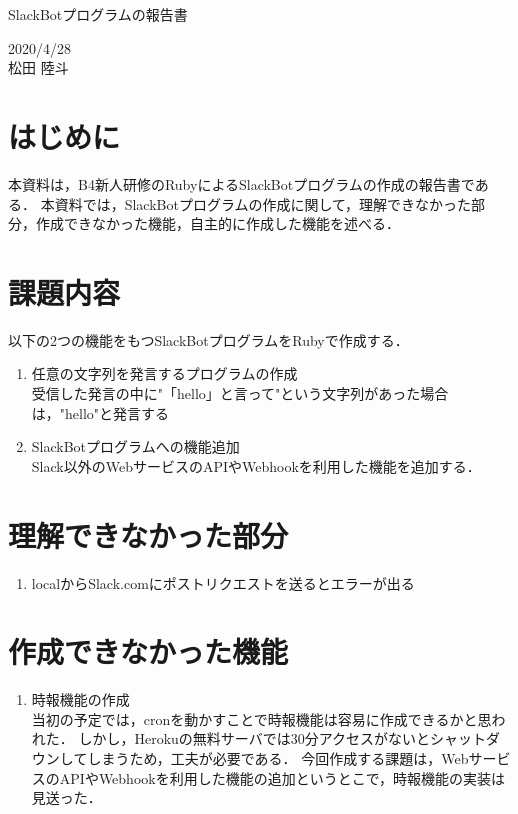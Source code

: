 \documentclass[12pt]{jsarticle}
\begin{document}
\begin{center}
{\LARGE SlackBotプログラムの報告書}
\end{center}

\begin{flushright}
  2020/4/28\\
  松田 陸斗
\end{flushright}
\section{はじめに}
\label{sec:introduction}
本資料は，B4新人研修のRubyによるSlackBotプログラムの作成の報告書である．
本資料では，SlackBotプログラムの作成に関して，理解できなかった部分，作成できなかった機能，自主的に作成した機能を述べる．

\section{課題内容}
以下の2つの機能をもつSlackBotプログラムをRubyで作成する．
\begin{enumerate}
\item 任意の文字列を発言するプログラムの作成\\
受信した発言の中に"「hello」と言って"という文字列があった場合は，"hello"と発言する
\item SlackBotプログラムへの機能追加\\
Slack以外のWebサービスのAPIやWebhookを利用した機能を追加する．
\end{enumerate}

\section{理解できなかった部分}
\begin{enumerate}
\item 	localからSlack.comにポストリクエストを送るとエラーが出る\\
\end{enumerate}

\section{作成できなかった機能}
\begin{enumerate}
\item 時報機能の作成\\
当初の予定では，cronを動かすことで時報機能は容易に作成できるかと思われた．
しかし，Herokuの無料サーバでは30分アクセスがないとシャットダウンしてしまうため，工夫が必要である．
今回作成する課題は，WebサービスのAPIやWebhookを利用した機能の追加というとこで，時報機能の実装は見送った．
\end{enumerate}
\end{document}
